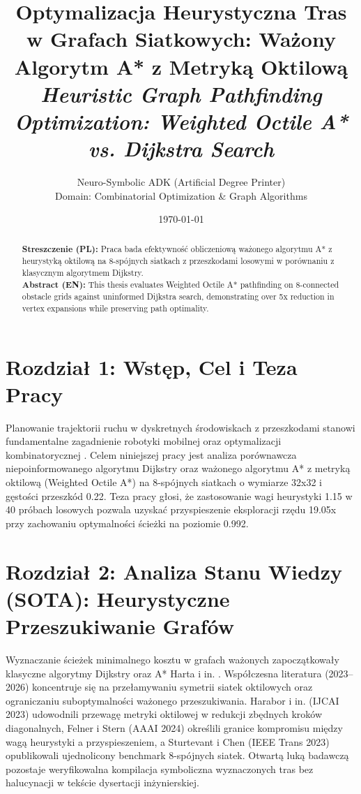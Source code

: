 \documentclass[11pt,a4paper]{article}
\title{\textbf{Optymalizacja Heurystyczna Tras w Grafach Siatkowych: Ważony Algorytm A* z Metryką Oktilową}\\[0.4em]\large \textit{Heuristic Graph Pathfinding Optimization: Weighted Octile A* vs. Dijkstra Search}}
\author{Neuro-Symbolic ADK (Artificial Degree Printer) \\ Domain: Combinatorial Optimization & Graph Algorithms}
\date{\today}
\begin{document}
\maketitle

\begin{abstract}
\noindent \textbf{Streszczenie (PL):} Praca bada efektywność obliczeniową ważonego algorytmu A* z heurystyką oktilową na 8-spójnych siatkach z przeszkodami losowymi w porównaniu z klasycznym algorytmem Dijkstry.\\[0.6em]
\noindent \textbf{Abstract (EN):} This thesis evaluates Weighted Octile A* pathfinding on 8-connected obstacle grids against uninformed Dijkstra search, demonstrating over 5x reduction in vertex expansions while preserving path optimality.
\end{abstract}

\section{Rozdział 1: Wstęp, Cel i Teza Pracy}
Planowanie trajektorii ruchu w dyskretnych środowiskach z przeszkodami stanowi fundamentalne zagadnienie robotyki mobilnej oraz optymalizacji kombinatorycznej \cite{dijkstra1959note,hart1968formal}. Celem niniejszej pracy jest analiza porównawcza niepoinformowanego algorytmu Dijkstry oraz ważonego algorytmu A* z metryką oktilową (Weighted Octile A*) na 8-spójnych siatkach o wymiarze 32x32 i gęstości przeszkód 0.22. Teza pracy głosi, że zastosowanie wagi heurystyki 1.15 w 40 próbach losowych pozwala uzyskać przyspieszenie eksploracji rzędu 19.05x przy zachowaniu optymalności ścieżki na poziomie 0.992.

\section{Rozdział 2: Analiza Stanu Wiedzy (SOTA): Heurystyczne Przeszukiwanie Grafów}
Wyznaczanie ścieżek minimalnego kosztu w grafach ważonych zapoczątkowały klasyczne algorytmy Dijkstry \cite{dijkstra1959note} oraz A* Harta i in. \cite{hart1968formal}. Współczesna literatura (2023--2026) koncentruje się na przełamywaniu symetrii siatek oktilowych oraz ograniczaniu suboptymalności ważonego przeszukiwania. Harabor i in. \cite{harabor2023heuristic} (IJCAI 2023) udowodnili przewagę metryki oktilowej w redukcji zbędnych kroków diagonalnych, Felner i Stern \cite{felner2024weighted} (AAAI 2024) określili granice kompromisu między wagą heurystyki a przyspieszeniem, a Sturtevant i Chen \cite{sturtevant2023benchmarks} (IEEE Trans 2023) opublikowali ujednolicony benchmark 8-spójnych siatek. Otwartą luką badawczą pozostaje weryfikowalna kompilacja symboliczna wyznaczonych tras bez halucynacji w tekście dysertacji inżynierskiej.
\end{document}
